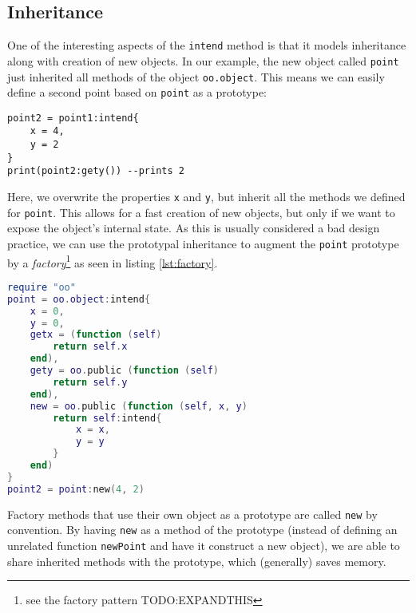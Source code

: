 \subsection{Inheritance}
\begin{comment}
TODO: Split this section into "inheritance" and "shortcuts"
Include self._super and self:super() in the "inheritance" part
Include oo.getter and oo.setter in the "shortcuts" part
\end{comment}


One of the interesting aspects of the \texttt{intend} method is that it models inheritance along with creation of new objects. In our example, the new object called \texttt{point} just inherited all methods of the object \texttt{oo.object}. This means we can easily define a second point based on \texttt{point} as a prototype:

\begin{lstlisting}[caption={Using \texttt{point1} as a protoype (continued from listing \ref{lst:point})}, label=lst:point2, name=lst:point]
point2 = point1:intend{
	x = 4,
	y = 2
}
print(point2:gety()) --prints 2
\end{lstlisting}

Here, we overwrite the properties \texttt{x} and \texttt{y}, but inherit all the methods we defined for \texttt{point}. This allows for a fast creation of new objects, but only if we want to expose the object's internal state. As this is usually considered a bad design practice, we can use the prototypal inheritance to augment the \texttt{point} prototype by a \emph{factory}\footnote{see the factory pattern TODO:EXPANDTHIS} as seen in listing \ref{lst:factory}.

\begin{lstlisting}[language=lua, caption={Building a factory for points.}, label=lst:factory, name=lst:factory]
require "oo"
point = oo.object:intend{
	x = 0,
	y = 0,
	getx = (function (self)
		return self.x
	end),
	gety = oo.public (function (self)
		return self.y
	end),
	new = oo.public (function (self, x, y)
		return self:intend{
			x = x,
			y = y
		}
	end)
}
point2 = point:new(4, 2)
\end{lstlisting}

Factory methods that use their own object as a prototype are called \texttt{new} by convention. By having \texttt{new} as a method of the prototype (instead of defining an unrelated function \texttt{newPoint} and have it construct a new object), we are able to share inherited methods with the prototype, which (generally) saves memory.

